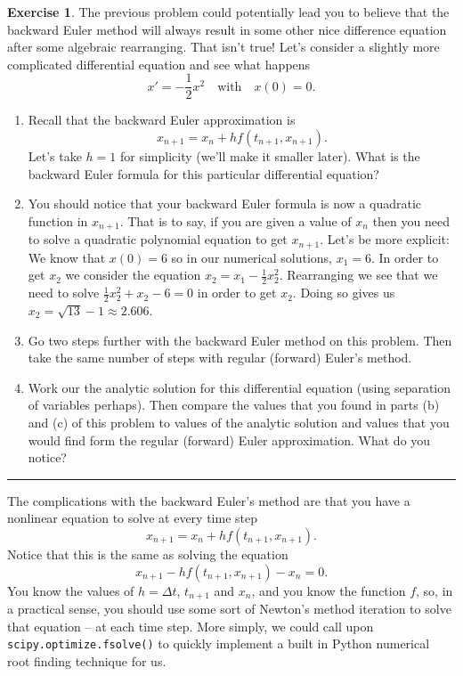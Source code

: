 \documentclass[
]{book}
\theoremstyle{definition}
\theoremstyle{definition}
\theoremstyle{definition}
\newtheorem{exercise}{Exercise}[chapter]
\theoremstyle{remark}
\begin{document}
\begin{exercise}
\protect\hypertarget{exr:unnamed-chunk-471}{}{\label{exr:unnamed-chunk-471} }The previous problem could potentially lead you to believe that the backward Euler method will always result in some other nice difference equation after some algebraic rearranging. That isn't true! Let's consider a slightly more complicated differential equation and see what happens
\[x' = -\frac{1}{2} x^2 \quad \text{with} \quad x(0) = 0.\]

\begin{enumerate}
\def\labelenumi{\alph{enumi}.}
\item
  Recall that the backward Euler approximation is
  \[x_{n+1} = x_n + h f(t_{n+1},x_{n+1}).\]
  Let's take \(h=1\) for simplicity (we'll make it smaller later). What is the backward Euler formula for this particular differential equation?
\item
  You should notice that your backward Euler formula is now a quadratic function in \(x_{n+1}\). That is to say, if you are given a value of \(x_n\) then you need to solve a quadratic polynomial equation to get \(x_{n+1}\). Let's be more explicit:\\
  We know that \(x(0) = 6\) so in our numerical solutions, \(x_1 = 6\). In order to get \(x_2\) we consider the equation \(x_2 = x_1 - \frac{1}{2} x_2^2\). Rearranging we see that we need to solve \(\frac{1}{2}x_2^2 + x_2 - 6 = 0\) in order to get \(x_2\). Doing so gives us \(x_2 = \sqrt{13} - 1 \approx 2.606\).
\item
  Go two steps further with the backward Euler method on this problem. Then take the same number of steps with regular (forward) Euler's method.
\item
  Work our the analytic solution for this differential equation (using separation of variables perhaps). Then compare the values that you found in parts (b) and (c) of this problem to values of the analytic solution and values that you would find form the regular (forward) Euler approximation. What do you notice?
\end{enumerate}
\end{exercise}

\begin{center}\rule{0.5\linewidth}{0.5pt}\end{center}

The complications with the backward Euler's method are that you have a
nonlinear equation to solve at every time step
\[x_{n+1} = x_n + h f(t_{n+1},x_{n+1}).\] Notice that this is the same
as solving the equation \[x_{n+1} - hf(t_{n+1},x_{n+1}) - x_n = 0.\] You
know the values of \(h=\Delta t\), \(t_{n+1}\) and \(x_n\), and you know the function \(f\), so, in a practical sense, you should use some sort of Newton's
method iteration to solve that equation -- at each time step. More simply, we could call upon \texttt{scipy.optimize.fsolve()} to quickly implement a built in Python numerical root finding technique for us.
\end{document}
